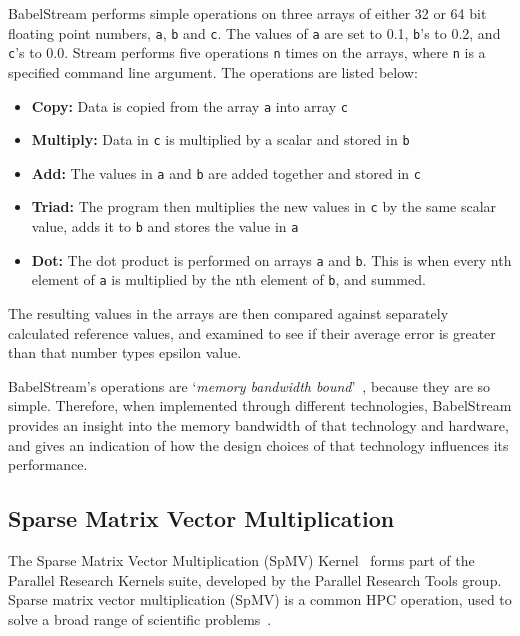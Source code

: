 BabelStream performs simple operations on three arrays of either 32 or 64 bit floating point numbers, \texttt{a}, \texttt{b} and \texttt{c}. The values of \texttt{a} are set to 0.1, \texttt{b}'s to 0.2, and \texttt{c}'s to 0.0. Stream performs five operations \texttt{n} times on the arrays, where \texttt{n} is a specified command line argument. The operations are listed below:
\begin{itemize}
  \item \textbf{Copy:} Data is copied from the array \texttt{a} into array \texttt{c}
  \item \textbf{Multiply:} Data in \texttt{c} is multiplied by a scalar and stored in \texttt{b}
  \item \textbf{Add:} The values in \texttt{a} and \texttt{b} are added together and stored in \texttt{c}
  \item \textbf{Triad:} The program then multiplies the new values in \texttt{c} by the same scalar value, adds it to \texttt{b} and stores the value in \texttt{a}
  \item \textbf{Dot:} The dot product is performed on arrays \texttt{a} and \texttt{b}. This is when every nth element of \texttt{a} is multiplied by the nth element of \texttt{b}, and summed.
\end{itemize}
The resulting values in the arrays are then compared against separately calculated reference values, and examined to see if their average error is greater than that number types epsilon value.

BabelStream's operations are `\textit{memory bandwidth bound}'~\cite{BabelStream}, because they are so simple. Therefore, when implemented through different technologies, BabelStream provides an insight into the memory bandwidth of that technology and hardware, and gives an indication of how the design choices of that technology influences its performance.

\subsection{Sparse Matrix Vector Multiplication}

The Sparse Matrix Vector Multiplication (SpMV) Kernel~\cite{ParResSparse} forms part of the Parallel Research Kernels suite, developed by the Parallel Research Tools group. Sparse matrix vector multiplication (SpMV) is a common HPC operation, used to solve a broad range of scientific problems~\cite{Sedaghati:2015, spMVGPU, DBLP:journals}.

